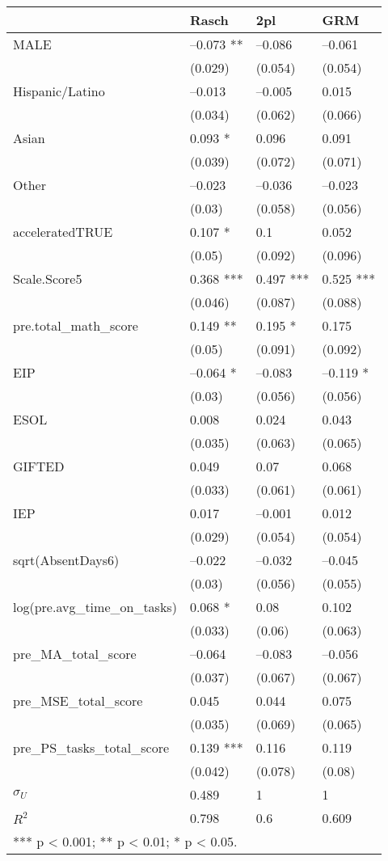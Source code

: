 \begin{tabular}{llll}
  \hline
  & Rasch & 2pl & GRM \\ 
   \hline
MALE & --0.073 ** & --0.086 & --0.061 \\ 
   & (0.029) & (0.054) & (0.054) \\ 
  Hispanic/Latino & --0.013 & --0.005 & 0.015 \\ 
   & (0.034) & (0.062) & (0.066) \\ 
  Asian & 0.093 * & 0.096 & 0.091 \\ 
   & (0.039) & (0.072) & (0.071) \\ 
  Other & --0.023 & --0.036 & --0.023 \\ 
   & (0.03) & (0.058) & (0.056) \\ 
  acceleratedTRUE & 0.107 * & 0.1 & 0.052 \\ 
   & (0.05) & (0.092) & (0.096) \\ 
  Scale.Score5 & 0.368 *** & 0.497 *** & 0.525 *** \\ 
   & (0.046) & (0.087) & (0.088) \\ 
  pre.total_math_score & 0.149 ** & 0.195 * & 0.175 \\ 
   & (0.05) & (0.091) & (0.092) \\ 
  EIP & --0.064 * & --0.083 & --0.119 * \\ 
   & (0.03) & (0.056) & (0.056) \\ 
  ESOL & 0.008 & 0.024 & 0.043 \\ 
   & (0.035) & (0.063) & (0.065) \\ 
  GIFTED & 0.049 & 0.07 & 0.068 \\ 
   & (0.033) & (0.061) & (0.061) \\ 
  IEP & 0.017 & --0.001 & 0.012 \\ 
   & (0.029) & (0.054) & (0.054) \\ 
  sqrt(AbsentDays6) & --0.022 & --0.032 & --0.045 \\ 
   & (0.03) & (0.056) & (0.055) \\ 
  log(pre.avg_time_on_tasks) & 0.068 * & 0.08 & 0.102 \\ 
   & (0.033) & (0.06) & (0.063) \\ 
  pre_MA_total_score & --0.064 & --0.083 & --0.056 \\ 
   & (0.037) & (0.067) & (0.067) \\ 
  pre_MSE_total_score & 0.045 & 0.044 & 0.075 \\ 
   & (0.035) & (0.069) & (0.065) \\ 
  pre_PS_tasks_total_score & 0.139 *** & 0.116 & 0.119 \\ 
   & (0.042) & (0.078) & (0.08) \\ 
   \hline
$\sigma_U$ & 0.489 & 1 & 1 \\ 
  $R^2$ & 0.798 & 0.6 & 0.609 \\ 
   \hline
\multicolumn{5}{l}{  *** p < 0.001;  ** p < 0.01;  * p < 0.05. } &  &  &  \\ 
  \end{tabular}
